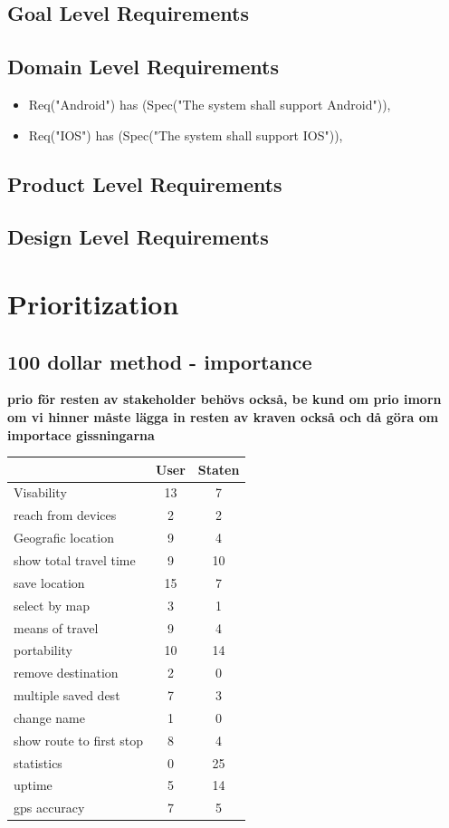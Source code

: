 \documentclass[a4paper]{article}
\begin{document}
		\subsection{Goal Level Requirements}
		\subsection{Domain Level Requirements}
		\begin{itemize}
			\item 	Req("Android") has (Spec("The system shall support Android")),
			\item	Req("IOS") has (Spec("The system shall support IOS")),
		\end{itemize}
		\subsection{Product Level Requirements}
					
		\subsection{Design Level Requirements}	
	\section{Prioritization}
		\subsection{100 dollar method -  importance}
		\textbf{prio för resten av stakeholder behövs också, be kund om prio imorn om vi hinner}
		\textbf{måste lägga in resten av kraven också och då göra om importace gissningarna}
		\begin{tabular}{|l|c|c|}
			\hline
			&User	&Staten \\
			\hline			
			Visability	&13	&7 \\
			\hline
			reach from devices	&2	&2 \\
			\hline
			Geografic location	&9	&4 \\
			\hline
			show total travel time	&9	&10 \\
			\hline
			save location	&15	&7 \\
			\hline
			select by map	&3	&1 \\
			\hline
			means of travel	&9	&4 \\
			\hline
			portability	&10	&14 \\
			\hline
			remove destination	&2	&0 \\
			\hline
			multiple saved dest	&7	&3 \\
			\hline
			change name	&1	&0 \\
			\hline
			show route to first stop	&8	&4 \\
			\hline
			statistics	&0	&25 \\
			\hline
			uptime	&5	&14 \\
			\hline
			gps accuracy	&7	&5 \\
			\hline			
			
		\end{tabular}
\end{document}
